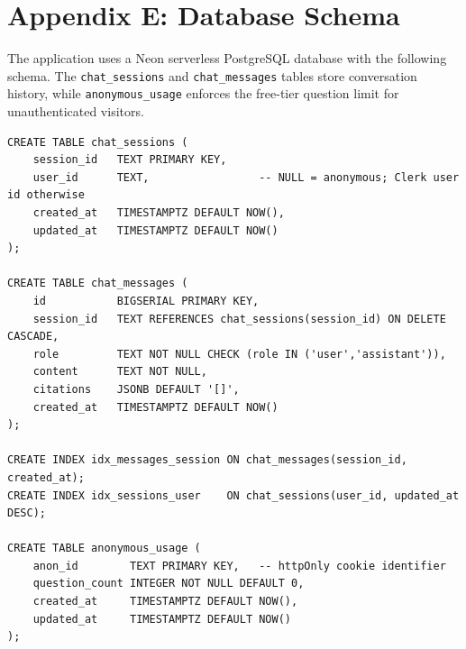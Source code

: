 \section*{Appendix E: Database Schema}

\hs The application uses a Neon serverless PostgreSQL database with the following schema.
The \texttt{chat\_sessions} and \texttt{chat\_messages} tables store conversation history,
while \texttt{anonymous\_usage} enforces the free-tier question limit for unauthenticated
visitors.

\begin{verbatim}
CREATE TABLE chat_sessions (
    session_id   TEXT PRIMARY KEY,
    user_id      TEXT,                 -- NULL = anonymous; Clerk user id otherwise
    created_at   TIMESTAMPTZ DEFAULT NOW(),
    updated_at   TIMESTAMPTZ DEFAULT NOW()
);

CREATE TABLE chat_messages (
    id           BIGSERIAL PRIMARY KEY,
    session_id   TEXT REFERENCES chat_sessions(session_id) ON DELETE CASCADE,
    role         TEXT NOT NULL CHECK (role IN ('user','assistant')),
    content      TEXT NOT NULL,
    citations    JSONB DEFAULT '[]',
    created_at   TIMESTAMPTZ DEFAULT NOW()
);

CREATE INDEX idx_messages_session ON chat_messages(session_id, created_at);
CREATE INDEX idx_sessions_user    ON chat_sessions(user_id, updated_at DESC);

CREATE TABLE anonymous_usage (
    anon_id        TEXT PRIMARY KEY,   -- httpOnly cookie identifier
    question_count INTEGER NOT NULL DEFAULT 0,
    created_at     TIMESTAMPTZ DEFAULT NOW(),
    updated_at     TIMESTAMPTZ DEFAULT NOW()
);
\end{verbatim}

